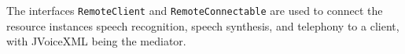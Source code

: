 \documentclass[11pt,a4paper]{article}
\begin{document}
\begin{center}
\end{center}

The interfaces \texttt{RemoteClient} and \texttt{RemoteConnectable} are used to
connect the resource instances speech recognition, speech synthesis, and
telephony to a client, with JVoiceXML being the mediator.
\end{document}
